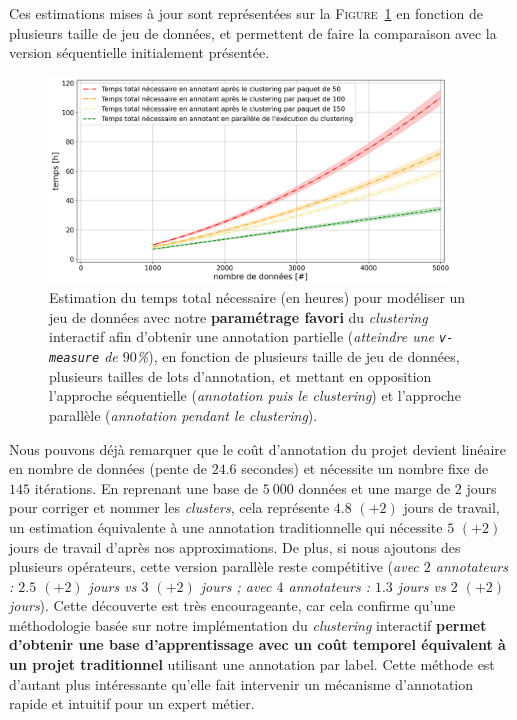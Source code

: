 			Ces estimations mises à jour sont représentées sur la \textsc{Figure~\ref{figure:4.3.4-ETUDE-COUT-TOTAL}} en fonction de plusieurs taille de jeu de données, et permettent de faire la comparaison avec la version séquentielle initialement présentée.
			
			\begin{figure}[!htb]
				\centering
				\includegraphics[width=0.95\textwidth]{figures/etude-temps-total-2-modelisation-parallele}
				\caption{
					Estimation du temps total nécessaire (en heures) pour modéliser un jeu de données avec notre \textbf{paramétrage favori} du \textit{clustering} interactif afin d'obtenir une annotation partielle (\textit{atteindre une \texttt{v-measure} de $90$\%}), en fonction de plusieurs taille de jeu de données, plusieurs tailles de lots d'annotation, et mettant en opposition l'approche séquentielle (\textit{annotation puis le clustering}) et l'approche parallèle (\textit{annotation pendant le clustering}).
				}
				\label{figure:4.3.4-ETUDE-COUT-TOTAL}
			\end{figure}
			
			Nous pouvons déjà remarquer que le coût d'annotation du projet devient linéaire en nombre de données (pente de $24.6$ secondes) et nécessite un nombre fixe de $145$ itérations.
			En reprenant une base de $5~000$ données et une marge de $2$ jours pour corriger et nommer les \textit{clusters}, cela représente $4.8$ {\footnotesize $(+2)$} jours de travail, un estimation équivalente à une annotation traditionnelle qui nécessite $5 $ {\footnotesize $(+2)$} jours de travail d'après nos approximations.
			De plus, si nous ajoutons des plusieurs opérateurs, cette version parallèle reste compétitive (\textit{avec $2$ annotateurs : $2.5$ {\footnotesize $(+2)$} jours vs $3$ {\footnotesize $(+2)$} jours ; avec $4$ annotateurs : $1.3$ jours vs $2$ {\footnotesize $(+2)$} jours}).
			Cette découverte est très encourageante, car cela confirme qu'une méthodologie basée sur notre implémentation du \textit{clustering} interactif \textbf{permet d'obtenir une base d'apprentissage avec un coût temporel équivalent à un projet traditionnel} utilisant une annotation par label.
			Cette méthode est d'autant plus intéressante qu'elle fait intervenir un mécanisme d'annotation rapide et intuitif pour un expert métier.
			
